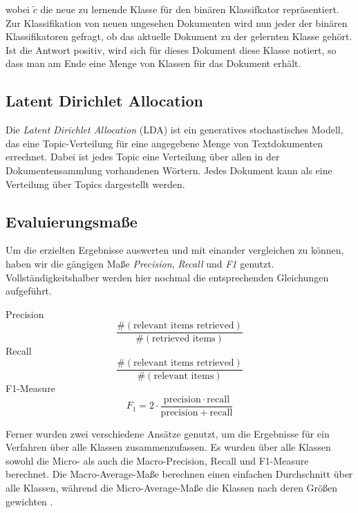 wobei $\tilde c$ die neue zu lernende Klasse für den binären Klassifkator repräsentiert.
Zur Klassifikation von neuen ungesehen Dokumenten wird nun jeder der binären Klassifikatoren gefragt, ob das aktuelle Dokument zu der gelernten Klasse gehört.
Ist die Antwort positiv, wird sich für dieses Dokument diese Klasse notiert, so dass man am Ende eine Menge von Klassen für das Dokument erhält.


\subsection{Latent Dirichlet Allocation}
\label{sub:latent_dirichlet_allocation}

Die \emph{Latent Dirichlet Allocation} (LDA) ist ein generatives stochastisches Modell, das eine Topic-Verteilung für eine angegebene Menge von Textdokumenten errechnet.
Dabei ist jedes Topic eine Verteilung über allen in der Dokumentensammlung vorhandenen Wörtern.
Jedes Dokument kann als eine Verteilung über Topics dargestellt werden.




\subsection{Evaluierungsmaße}
Um die erzielten Ergebnisse auswerten und mit einander vergleichen zu können, haben wir die gängigen Maße \emph{Precision}, \emph{Recall} und \emph{F1} genutzt.
Vollständigkeitshalber werden hier nochmal die entsprechenden Gleichungen aufgeführt.

Precision \[\frac{\#(\text{relevant items retrieved})}{\#(\text{retrieved items})}\]
Recall \[\frac{\#(\text{relevant items retrieved})}{\#(\text{relevant items})}\]
F1-Measure \[F_1 = 2 \cdot \frac{\mathrm{precision} \cdot \mathrm{recall}}{\mathrm{precision} + \mathrm{recall}}\]

Ferner wurden zwei verschiedene Ansätze genutzt, um die Ergebnisse für ein Verfahren über alle Klassen zusammenzufassen.
Es wurden über alle Klassen sowohl die Micro- als auch die Macro-Precision, Recall und F1-Measure berechnet.
Die Macro-Average-Maße berechnen einen einfachen Durchschnitt über alle Klassen, während die Micro-Average-Maße die Klassen nach deren Größen gewichten \cite{Manning:2008:IIR:1394399}.

